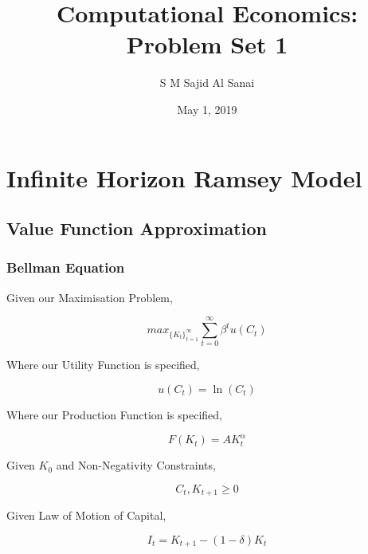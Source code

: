 \documentclass{article}
\title{Computational Economics: Problem Set 1}
\author{S M Sajid Al Sanai}
\date{May 1, 2019}
\begin{document}
\maketitle
{}
\tableofcontents


\newpage

\section{Infinite Horizon Ramsey Model}

\subsection{Value Function Approximation}

\subsubsection{Bellman Equation}

\noindent Given our Maximisation Problem,

\begin{equation}
max_{\{ K_t \}_{t=1} ^{\infty} } \sum_{t=0} ^{\infty} \beta^t u(C_t)
\end{equation}

\noindent Where our Utility Function is specified,

\begin{equation}
u(C_t) = \ln(C_t)
\end{equation}

\noindent Where our Production Function is specified,

\begin{equation}
F(K_t) = AK^{\alpha} _t
\end{equation}

\noindent Given $K_0$ and Non-Negativity Constraints,

\begin{equation}
C_t,K_{t+1}\geq 0
\end{equation}

\noindent Given Law of Motion of Capital,

\begin{equation}
I_t=K_{t+1}-(1-\delta)K_t
\end{equation}
\end{document}
